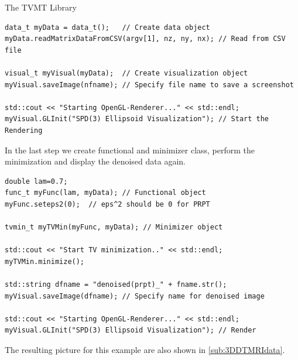 \begin{chapter}{The TVMT Library}
\cppinline
\begin{lstlisting}[label=code:tut3_rendernoisyimg,caption={Data input and displaying the noisy data}]
data_t myData = data_t();   // Create data object
myData.readMatrixDataFromCSV(argv[1], nz, ny, nx); // Read from CSV file

visual_t myVisual(myData);  // Create visualization object
myVisual.saveImage(nfname); // Specify file name to save a screenshot

std::cout << "Starting OpenGL-Renderer..." << std::endl;
myVisual.GLInit("SPD(3) Ellipsoid Visualization"); // Start the Rendering
\end{lstlisting}

In the last step we create functional and minimizer class, perform the minimization and display the denoised data again.

\cppinline
\begin{lstlisting}[label=code:tut3_rendernoisyimg,caption={Minimization and final rendering}]
double lam=0.7;
func_t myFunc(lam, myData); // Functional object
myFunc.seteps2(0);  // eps^2 should be 0 for PRPT

tvmin_t myTVMin(myFunc, myData); // Minimizer object

std::cout << "Start TV minimization.." << std::endl;
myTVMin.minimize();

std::string dfname = "denoised(prpt)_" + fname.str();
myVisual.saveImage(dfname); // Specify name for denoised image

std::cout << "Starting OpenGL-Renderer..." << std::endl;
myVisual.GLInit("SPD(3) Ellipsoid Visualization"); // Render
\end{lstlisting}

The resulting picture for this example are also shown in \ref{sub:3DDTMRIdata}.







\end{chapter}
